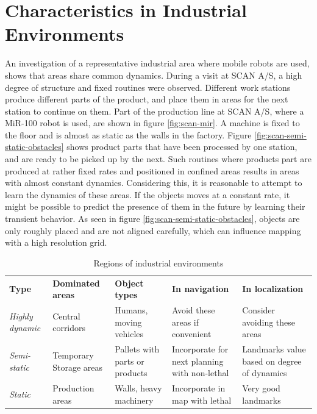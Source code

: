 \section{Characteristics in Industrial Environments}
\label{sec:characteristics_in_industrial_environments}
An investigation of a representative industrial area where mobile robots are used, shows that areas share common dynamics. 
During a visit at SCAN A/S, a high degree of structure and fixed routines were observed. 
Different work stations produce different parts of the product, and place them in areas for the next station to continue on them.
Part of the production line at SCAN A/S, where a MiR-100 robot is used, are shown in figure \ref{fig:scan-mir}. 
A machine is fixed to the floor and is almost as static as the walls in the factory.
Figure \ref{fig:scan-semi-static-obstacles} shows product parts that have been processed by one station, and are ready to be picked up by the next.
Such routines where products part are produced at rather fixed rates and positioned in confined areas results in areas with almost constant dynamics. 
Considering this, it is reasonable to attempt to learn the dynamics of these areas.
If the objects moves at a constant rate, it might be possible to predict the presence of them in the future by learning their transient behavior.
As seen in figure  \ref{fig:scan-semi-static-obstacles}, objects are only roughly placed and are not aligned carefully, which can influence mapping with a high resolution grid.

\begin{table}[htbp]
	\caption{Regions of industrial environments}
	\label{tab:regions_of_industrial_environments}
	\begin{center}
		\begin{tabular}{p{} | p{2.6cm} | p{2.6cm} | p{2.6cm} | p{2.6cm}}
			\toprule
			\textbf{Type} & \textbf{Dominated areas} & \textbf{Object types} & \textbf{In navigation} & \textbf{In localization} \\ 
			\rowcolor[gray]{0.925}
			\textit{Highly dynamic} & Central corridors & Humans, moving vehicles & Avoid these areas if convenient & Consider avoiding these areas \\
			\textit{Semi-static} & Temporary Storage areas & Pallets with parts or products & Incorporate for next planning with non-lethal & Landmarks value based on degree of dynamics \\ 
			\rowcolor[gray]{0.925}
			\textit{Static} & Production areas & Walls, heavy machinery & Incorporate in map with lethal & Very good landmarks \\			
			\bottomrule
		\end{tabular} 
	\end{center}
\end{table}


